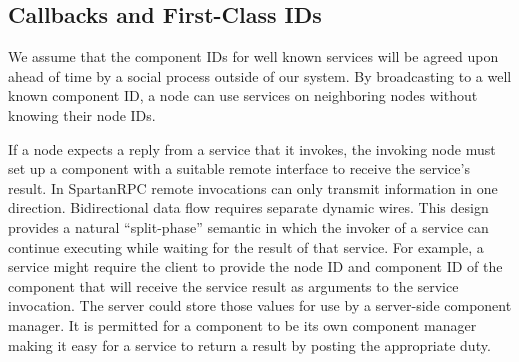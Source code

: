 \subsection{Callbacks and First-Class IDs}

We assume that the component IDs for well known services will be agreed
upon ahead of time by a social process outside of our system. By
broadcasting to a well known component ID, a node can use services on
neighboring nodes without knowing their node IDs.

If a node expects a reply from a service that it invokes, the invoking
node must set up a component with a suitable remote interface to receive
the service's result. In SpartanRPC remote invocations can only transmit
information in one direction. Bidirectional data flow requires separate
dynamic wires. This design provides a natural ``split-phase'' semantic
in which the invoker of a service can continue executing while waiting
for the result of that service. For example, a service might require the
client to provide the node ID and component ID of the component that
will receive the service result as arguments to the service invocation.
The server could store those values for use by a server-side component
manager. It is permitted for a component to be its own component manager
making it easy for a service to return a result by posting the
appropriate duty.

%
%
